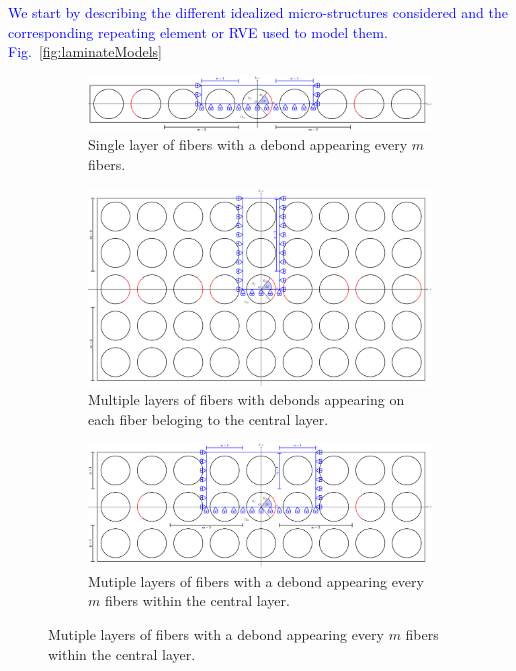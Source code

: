 \documentclass[review]{elsarticle}
\begin{document}
\textcolor{blue}{We start by describing the different idealized micro-structures considered and the corresponding repeating element or RVE used to model them. Fig.~\ref{fig:laminateModels}}

\begin{figure}[!h]
\centering
    \begin{subfigure}[b]{\textwidth}
        \includegraphics[width=\textwidth]{freeThinPly.pdf}
        \caption{Single layer of fibers with a debond appearing every $m$ fibers.}\label{subfig:freethinply}
    \end{subfigure}

    \begin{subfigure}[b]{\textwidth}
        \includegraphics[width=\textwidth]{thickPlycentraldebondsline.pdf}
        \caption{Multiple layers of fibers with debonds appearing on each fiber beloging to the central layer.}\label{subfig:thickplycentraldebonds}
    \end{subfigure} 

    \begin{subfigure}[b]{\textwidth}
        \includegraphics[width=\textwidth]{thickPly.pdf}
        \caption{Mutiple layers of fibers with a debond appearing every $m$ fibers within the central layer.}\label{subfig:thickply}
    \end{subfigure} 


\end{figure}
\end{document}
